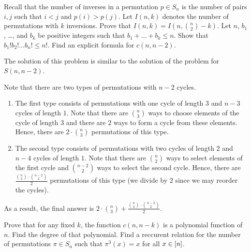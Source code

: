 \begin{chapterendexercises}
  \exercise[recommended] Recall that the number of inverses in a permutation 
    $p \in S_n$ is the number of pairs $i, j$ such that $i < j$ and 
    $p(i) > p(j)$. Let $I(n, k)$ denotes the number of permutations with $k$
    inversions. Prove that $I(n, k) = I(n, \binom{n}{2} - k)$.
  \exercise Let $n$, $b_1$, \dots, and $b_k$ be positive integers such that 
    $b_1 + \dots + b_k \le n$. Show that $b_1! b_2! \dots b_n! \le n!$.
  \exercise[recommended] Find an explicit formula for $c(n, n - 2)$.
    \begin{solution}
      The solution of this problem is similar to the solution of the problem for
      $S(n, n - 2)$.

      Note that there are two types of permutations with $n - 2$ cycles.
      \begin{enumerate}
        \item The first type consists of permutations with one cycle of length
          $3$ and $n - 3$ cycles of length $1$. Note that there are $\binom{n}{3}$
          ways to choose elements of the cycle of length $3$ and there are $2$
          ways to form a cycle from these elements. Hence, there are $2 \cdot
          \binom{n}{3}$ permutations of this type.
        \item The second type consists of permutations with two cycles of length $2$
          and $n - 4$ cycles of length $1$. Note that there are $\binom{n}{2}$
          ways to select elements of the first cycle and $\binom{n - 2}{2}$ ways
          to select the second cycle. Hence, there are $\frac{\binom{n}{2} \cdot
          \binom{n - 2}{2}}{2}$ permutations of this type (we divide by $2$ since
          we may reorder the cycles).
      \end{enumerate}

      As a result, the final answer is $2 \cdot \binom{n}{3} + \frac{\binom{n}{2}
      \cdot \binom{n - 2}{2}}{2}$.
    \end{solution}
  \exercise Prove that for any fixed $k$, the function $c(n, n - k)$ is a
    polynomial function of $n$. Find the degree of that polynomial.
  \exercise Find a reccurent relation for the number of permutations $\pi \in
    S_n$ such that $\pi^3(x) = x$ for all $x \in {[{n}]}$.


\end{chapterendexercises}
